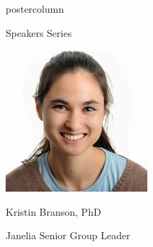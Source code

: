 \documentclass{beamer}
\begin{document}
\begin{frame}
\begin{columns}
\begin{column}{.33\textwidth}
\begin{beamercolorbox}[center,wd=\textwidth]{postercolumn}
\begin{minipage}[T]{.95\textwidth}
{\begin{myblock}{Speakers Series}
\begin{addmargin}[1em]{1em}
\begin{minipage}{0.4\linewidth}
                    \includegraphics[width=\linewidth]{img/kristin.jpg}
                    \centerline{Kristin Branson, PhD}\newline
                    \centerline{Janelia Senior Group Leader}
                \end{minipage}
            \end{addmargin}
            \vspace{1cm}


\end{myblock}}
\end{minipage}
\end{beamercolorbox}
\end{column}
\end{columns}
\end{frame}
\end{document}

